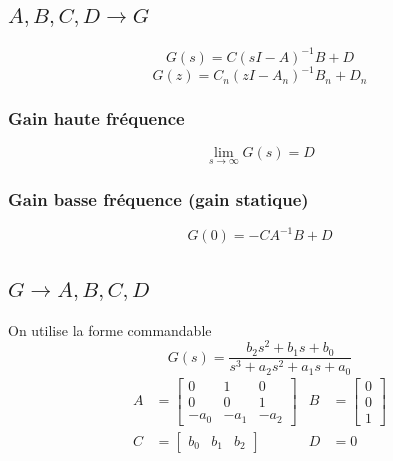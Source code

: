 \documentclass[resume]{subfiles}
\begin{document}
\subsection{$A,B,C,D \longrightarrow G$}
$$G(s)=C(sI-A)^{-1}B+D$$
$$G(z)=C_n(zI-A_n)^{-1}B_n+D_n$$
\subsubsection{Gain haute fréquence}
$$\lim_{s\to\infty}G(s)=D$$
\subsubsection{Gain basse fréquence (gain statique)}
$$G(0)=-CA^{-1}B+D$$
\subsection{$G\longrightarrow A,B,C,D$}
On utilise la forme commandable
$$G(s)=\frac{b_2s^2+b_1s+b_0}{s^3+a_2s^2+a_1s+a_0}$$
$$\boxed{\begin{split}
A&=\begin{bmatrix}0 & 1 & 0\\0 & 0 &1\\-a_0 & -a_1 & -a_2\end{bmatrix} &
B&= \begin{bmatrix}
0\\0\\1
\end{bmatrix}\\
C&=\begin{bmatrix}b_0 & b_1 & b_2\end{bmatrix} & D&=0\end{split}}$$
\end{document}
